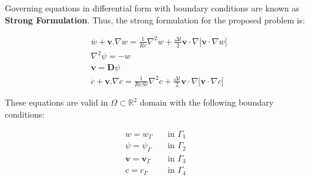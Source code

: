 Governing equations in differential form 
with boundary conditions are known as \textbf{Strong Formulation}. 
Thus, the strong formulation for the proposed problem is:

\begin{align}
& \overset{.}{w} + \textbf{v}.\nabla w = \frac{1}{Re} \nabla^2 w 
 + \frac{\Delta t}{2} \textbf{v} \cdot \nabla \big[ \textbf{v} \cdot \nabla w \big] \label{vorticity taylor-galerkin} \\[10pt]
& \nabla^2 \psi = - w \\[10pt]
& \textbf{v} = \textbf{D}\psi \\[10pt]
& \overset{.}{c} + \textbf{v}.\nabla c = \frac{1}{ReSc} \nabla^2 c
 + \frac{\Delta t}{2} \textbf{v} \cdot \nabla \big[ \textbf{v} \cdot \nabla c \big] \label{concentration taylor-galerkin}
\end{align}


\medskip
\noindent
These equations are valid in 
$\Omega \subset \mathbb{R}^2$ domain
with the following boundary conditions:

\begin{equation} \label{bc}
 \begin{aligned}
  w = w_\Gamma \quad & \mbox{in $\Gamma_1$}\\
  \psi = \psi_\Gamma \quad & \mbox{in $\Gamma_2$}\\
  \textbf{v} = \textbf{v}_\Gamma \quad & \mbox{in $\Gamma_3$}\\
  c = c_\Gamma \quad & \mbox{in $\Gamma_4$}
\end{aligned}
\end{equation}

